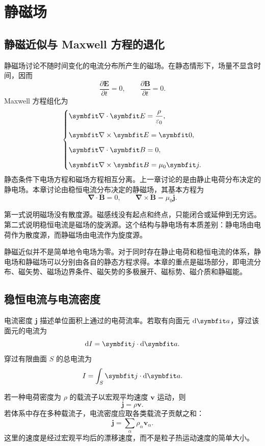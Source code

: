 \chapter{静磁场}

\section{静磁近似与 Maxwell 方程的退化}

静磁场讨论不随时间变化的电流分布所产生的磁场。在静态情形下，场量不显含时间，因而
\[
\frac{\partial \bm{E}}{\partial t}=0,
\qquad
\frac{\partial \bm{B}}{\partial t}=0.
\]
Maxwell 方程组化为
\begin{equation}
	\begin{dcases}
		\bm{\nabla}\cdot\bm{E}=\frac{\rho}{\varepsilon_{0}}, \\[6pt]
		\bm{\nabla}\times\bm{E}=\bm{0}, \\[6pt]
		\bm{\nabla}\cdot\bm{B}=0, \\[6pt]
		\bm{\nabla}\times\bm{B}=\mu_{0}\bm{j}.
	\end{dcases}
	\label{eq:maxwell-static}
\end{equation}
静态条件下电场方程和磁场方程相互分离。上一章讨论的是由静止电荷分布决定的静电场。本章讨论由稳恒电流分布决定的静磁场，其基本方程为
\begin{equation}
	\bm{\nabla}\cdot\bm{B}=0,
	\qquad
	\bm{\nabla}\times\bm{B}
	=
	\mu_{0}\bm{j}.
	\label{eq:11:magnetostatic-equations}
\end{equation}

第一式说明磁场没有散度源。磁感线没有起点和终点，只能闭合或延伸到无穷远。第二式说明稳恒电流是磁场的旋涡源。这个结构与静电场有本质差别：静电场由电荷作为散度源，而静磁场由电流作为旋度源。

静磁近似并不是简单地令电场为零。对于同时存在静止电荷和稳恒电流的体系，静电场和静磁场可以分别由各自的静态方程求得。本章的重点是磁场部分，即电流分布、磁矢势、磁场边界条件、磁矢势的多极展开、磁标势、磁介质和静磁能。

\section{稳恒电流与电流密度}

电流密度 $\bm{j}$ 描述单位面积上通过的电荷流率。若取有向面元 $\dif\bm{a}$，穿过该面元的电流为
\[
\dif I
=
\bm{j}\cdot\dif\bm{a}.
\]
穿过有限曲面 $S$ 的总电流为
\[
I
=
\int_{S}\bm{j}\cdot\dif\bm{a}.
\]

若一种电荷密度为 $\rho$ 的载流子以宏观平均速度 $\bm{v}$ 运动，则
\[
\bm{j}=\rho\bm{v}.
\]
若体系中存在多种载流子，电流密度应取各类载流子贡献之和：
\[
\bm{j}
=
\sum_{\alpha}
\rho_{\alpha}\bm{v}_{\alpha}.
\]
这里的速度是经过宏观平均后的漂移速度，而不是粒子热运动速度的简单大小。

